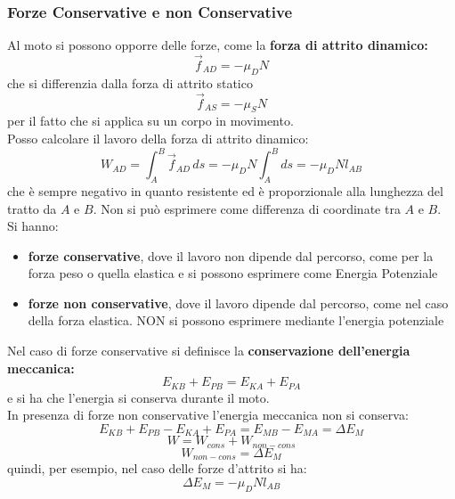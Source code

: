 \documentclass[a4paper,12pt, oneside]{book}
\begin{document}
\subsubsection{Forze Conservative e non Conservative}
Al moto si possono opporre delle forze, come la \textbf{forza di attrito dinamico:}
$$\vec{f}_{AD}=-\mu_DN$$
che si differenzia dalla forza di attrito statico
$$\vec{f}_{AS}=-\mu_SN$$
per il fatto che si applica su un corpo in movimento.\\
Posso calcolare il lavoro della forza di attrito dinamico:
$$W_{AD}=\int_A^B\vec{f}_{AD}\,ds=-\mu_DN\int_A^Bds=-\mu_DNl_{AB}$$
che è sempre negativo in quanto resistente ed è proporzionale alla lunghezza del tratto da $A$ e $B$. Non si può esprimere come differenza di coordinate tra $A$ e $B$.\\
Si hanno:
\begin{itemize}
	\item \textbf{forze conservative}, dove il lavoro non dipende dal percorso, come per la forza peso o quella elastica e si possono esprimere come Energia Potenziale
	\item \textbf{forze non conservative}, dove il lavoro dipende dal percorso, come nel caso della forza elastica. NON si possono esprimere mediante l'energia potenziale
\end{itemize}
Nel caso di forze conservative si definisce la \textbf{conservazione dell'energia meccanica:}
$$E_{KB}+E_{PB}=E_{KA}+E_{PA}$$
e si ha che l'energia si conserva durante il moto.\\
In presenza di forze non conservative l'energia meccanica non si conserva:
$$E_{KB}+E_{PB}-E_{KA}+E_{PA}=E_{MB}-E_{MA}=\Delta E_M$$
$$W=W_{cons}+W_{non-cons}$$
$$W_{non-cons}=\Delta E_M$$
quindi, per esempio, nel caso delle forze d'attrito si ha:
$$\Delta E_M=-\mu_DNl_{AB}$$
\end{document}
